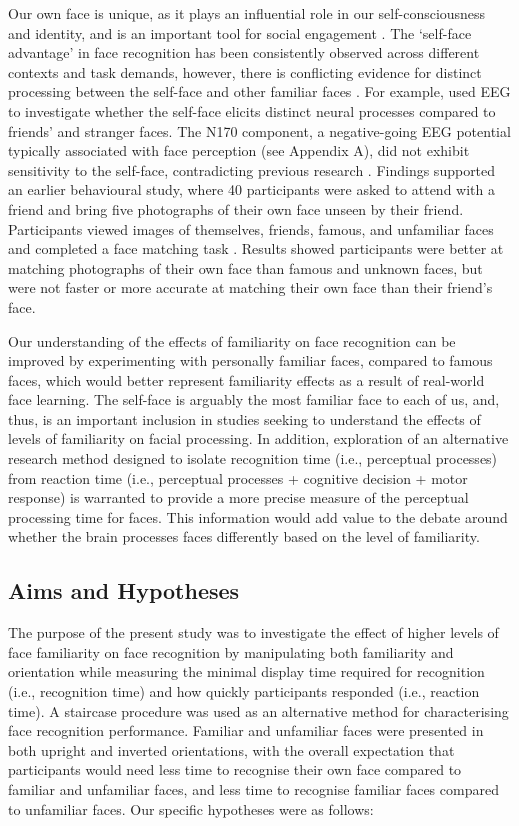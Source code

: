 \documentclass[
  10pt,
  letterpaper,
]{article}
\begin{document}
Our own face is unique, as it plays an influential role in our
self-consciousness and identity, and is an important tool for social
engagement \citep{bortolon2018a}. The `self-face advantage' in face
recognition has been consistently observed across different contexts and
task demands, however, there is conflicting evidence for distinct
processing between the self-face and other familiar faces
\citep{alzueta2019a, tong1999a, wiese2019a}. For example,
\citet{alzueta2019a} used EEG to investigate whether the self-face
elicits distinct neural processes compared to friends' and stranger
faces. The N170 component, a negative-going EEG potential typically
associated with face perception (see Appendix A), did not exhibit
sensitivity to the self-face, contradicting previous research
\citep{caharel2021a, wiese2019a}. Findings supported an earlier
behavioural study, where 40 participants were asked to attend with a
friend and bring five photographs of their own face unseen by their
friend. Participants viewed images of themselves, friends, famous, and
unfamiliar faces and completed a face matching task
\citep{bortolon2017a}. Results showed participants were better at
matching photographs of their own face than famous and unknown faces,
but were not faster or more accurate at matching their own face than
their friend's face.

Our understanding of the effects of familiarity on face recognition can
be improved by experimenting with personally familiar faces, compared to
famous faces, which would better represent familiarity effects as a
result of real-world face learning. The self-face is arguably the most
familiar face to each of us, and, thus, is an important inclusion in
studies seeking to understand the effects of levels of familiarity on
facial processing. In addition, exploration of an alternative research
method designed to isolate recognition time (i.e., perceptual processes)
from reaction time (i.e., perceptual processes + cognitive decision +
motor response) is warranted to provide a more precise measure of the
perceptual processing time for faces. This information would add value
to the debate around whether the brain processes faces differently based
on the level of familiarity.

\subsection{Aims and Hypotheses}\label{aims-and-hypotheses}

The purpose of the present study was to investigate the effect of higher
levels of face familiarity on face recognition by manipulating both
familiarity and orientation while measuring the minimal display time
required for recognition (i.e., recognition time) and how quickly
participants responded (i.e., reaction time). A staircase procedure was
used as an alternative method for characterising face recognition
performance. Familiar and unfamiliar faces were presented in both
upright and inverted orientations, with the overall expectation that
participants would need less time to recognise their own face compared
to familiar and unfamiliar faces, and less time to recognise familiar
faces compared to unfamiliar faces. Our specific hypotheses were as
follows:
\end{document}

